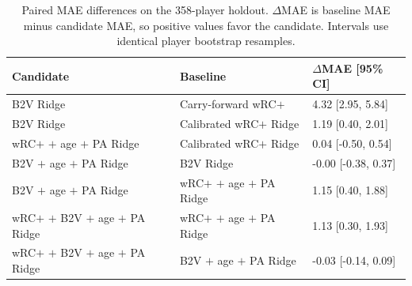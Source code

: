 \begin{table}[t]
\centering
\caption{Paired MAE differences on the 358-player holdout. $\Delta$MAE is baseline MAE minus candidate MAE, so positive values favor the candidate. Intervals use identical player bootstrap resamples.}
\label{tab:paired}
\scriptsize
\begin{tabular}{lll}
\toprule
Candidate & Baseline & $\Delta$MAE [95\% CI] \\
\midrule
B2V Ridge & Carry-forward wRC$+$ & 4.32 [2.95, 5.84] \\
B2V Ridge & Calibrated wRC$+$ Ridge & 1.19 [0.40, 2.01] \\
wRC$+$ $+$ age $+$ PA Ridge & Calibrated wRC$+$ Ridge & 0.04 [-0.50, 0.54] \\
B2V $+$ age $+$ PA Ridge & B2V Ridge & -0.00 [-0.38, 0.37] \\
B2V $+$ age $+$ PA Ridge & wRC$+$ $+$ age $+$ PA Ridge & 1.15 [0.40, 1.88] \\
wRC$+$ $+$ B2V $+$ age $+$ PA Ridge & wRC$+$ $+$ age $+$ PA Ridge & 1.13 [0.30, 1.93] \\
wRC$+$ $+$ B2V $+$ age $+$ PA Ridge & B2V $+$ age $+$ PA Ridge & -0.03 [-0.14, 0.09] \\
\bottomrule
\end{tabular}
\end{table}
